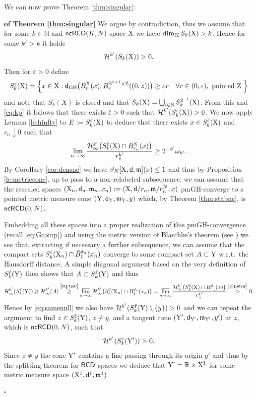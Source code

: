 \documentclass[reqno,11pt]{article}
\numberwithin{equation}{section}
\newcommand{\N}{\mathbb{N}}
\newcommand{\R}{\mathbb{R}}
\newcommand{\Z}{\mathbb{Z}}
\newcommand{\mm}{{\mbox{\boldmath$m$}}}
\newcommand{\sfd}{{\sf d}}
\newcommand{\eps}{\varepsilon}
\newcommand{\lims}{\varlimsup}
\renewcommand{\mm}{\mathfrak m}                                %
\newenvironment{proofb}{\removelastskip\par\medskip   %
\noindent{\em{\bf Proof}} \rm}{\penalty-20\null\hfill$\square$\par\medbreak}
\newcommand{\X}{{\rm X}}
\newcommand{\Y}{{\rm Y}}
\renewcommand{\Z}{{\rm Z}}
\newcommand{\RCD}{{\sf RCD}}
\newcommand{\ncRCD}{{\sf ncRCD}}
\newcommand{\HH}{{\mathcal H}}
\begin{document}
We can now prove Theorem \ref{thm:singular}:
\begin{proofb}{\bf  of Theorem \ref{thm:singular}}
We argue by contradiction, thus we assume that for some  \(k\in \N\) and $\ncRCD(K,N)$ space $\X$ we have $\dim_{\HH} S_k(\X) >k$. Hence for some $k'>k$ it holds
\begin{equation}
\label{eq:kp}
\HH^{k'} (S_k(\X))>0.
\end{equation}
Then for \(\eps>0\) define
\[
S^\eps_k(\X)=\Big\{ x\in\X: \sfd_{\rm GH}\big(B_r^\X(x), B_r^{\R^{k+1}\times \Z}((0,z))\big)\ge \eps r\quad \forall r\in(0, \eps),\textrm{ pointed \(\Z\) } \Big\}
\]
and note that \(S^\eps_k(X)\) is closed and that $S_k(\X)=\bigcup_{i\in\N} S^{2^{-i}}_k(\X)$.
From this and \eqref{eq:kp} it follows that  there exists \(\bar \eps>0\) such that $\HH^{k'} (S^{\bar \eps}_k(\X))>0$.
We now apply Lemma \ref{le:hinfty} to $E:=S^{\bar \eps}_k(\X)$ to deduce that there exists $x\in S^{\bar \eps}_k(\X)$ and $r_n\downarrow0$ such that 
\begin{equation}\label{cluster}
\lim_{n\to\infty} \frac{\HH_{\infty}^{k'}\big(S^{\bar \eps}_k(\X)\cap B^{\X}_{r_n}(x)\big)}{r_n^{k'}}\ge 2^{-k'} \omega_{k'}.
\end{equation}
By Corollary \ref{cor:densnc}  we have  \(\vartheta_N[\X, \sfd, \mm](x)\leq 1\) and thus  by  Proposition \ref{le:metriccone}, up to pass to a non-relabeled subsequence, we can assume that the rescaled spaces $(\X_n,\sfd_n,\mm_n,x_n):=(\X,\sfd/r_n,\mm/r_n^N, x)$ pmGH-converge to  a pointed metric measure cone \((\Y,\sfd_\Y,\mm_\Y,y)\) which, by Theorem \ref{thm:stabnc}, is $\ncRCD(0,N)$.

Embedding all these spaces into a proper realization of this pmGH-convergence (recall \eqref{eq:Gcomp}) and using the metric version of Blaschke's theorem (see \cite[Theorem 7.3.8]{BBI01}) we see that, extracting if necessary a further subsequence, we can assume that the {compact }sets $S^{\bar \eps}_k(\X_n)\cap \bar B^{\sfd_n}_1(x_n)$ converge to some compact set $A\subset\Y$ w.r.t.\ the Hausdorff distance. A  simple diagonal argument based on the very definition of $S^{\bar \eps}_k(\Y)$ then shows that $A\subset S^{\bar \eps}_k(\Y)$ and thus
\[
\HH^{k'}_\infty (S^{\bar \eps}_k(\Y))\geq \HH^{k'}_\infty(A)\stackrel{\eqref{eq:usc}}\geq\lims_{n\to\infty}\HH_\infty^{k'}\big(S^{\bar \eps}_k(\X_n)\cap B^{\sfd_n}_1(x_n)\big)=\lims_{n\to\infty}\frac{\HH_\infty^{k'}\big(S^{\bar \eps}_k(\X)\cap B^{\sfd}_{r_n}(x) \big)}{r_n^{k'}}\stackrel{\eqref{cluster}}>0.
\]
Hence by \eqref{eq:samenull} we also have  $\HH^{k'}(S^{\bar\eps}_k(\Y)\setminus \{y\})>0$ and we can repeat the argument to find $z\in S^{\bar\eps}_k(\Y)$, $z\neq y$, and a tangent cone $(\Y',\sfd_{\Y'},\mm_{\Y'},y')$ at $z$, which is $\ncRCD(0,N)$, such that 
\begin{equation}
\label{eq:accap}
\HH^{k'}(S^{\bar \eps}_k(\Y'))>0. 
\end{equation}
Since $z\neq y$ the cone $\Y'$ contains a line passing through its origin $y'$ and thus by the splitting theorem for $\RCD$ spaces we deduce that $\Y'=\R\times \X^1$ for some  metric measure space $(\X^1,\sfd^1,\mm^1)$.


\end{proofb}
\end{document}
